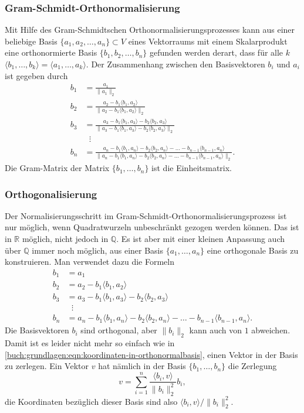 \subsubsection{Gram-Schmidt-Orthonormalisierung}
Mit Hilfe des Gram-Schmidtschen Orthonormalisierungsprozesses kann aus
einer beliebige Basis $\{a_1,a_2,\dots,a_n\}\subset V$ eines Vektorraums
mit einem Skalarprodukt eine orthonormierte Basis 
$\{b_1,b_2,\dots,b_n\}$ gefunden werden derart, dass für alle $k$
$\langle b_1,\dots,b_k\rangle = \langle a_1,\dots ,a_k\rangle$.
%
Der Zusammenhang zwischen den Basisvektoren $b_i$ und $a_i$ ist
gegeben durch
\begin{align*}
b_1&=\frac{a_1}{\|a_1\|_2}
\\
b_2&=\frac{a_2-b_1\langle b_1,a_2\rangle}{\|a_2-b_1\langle b_1,a_2\rangle\|_2}
\\
b_3&=\frac{a_3-b_1\langle b_1,a_3\rangle-b_2\langle b_2,a_3\rangle}{\|a_3-b_1\langle b_1,a_3\rangle-b_2\langle b_2,a_3\rangle\|_2}
\\
&\phantom{n}\vdots\\
b_n
&=
\frac{
a_n-b_1\langle b_1,a_n\rangle-b_2\langle b_2,a_n\rangle
-\dots-b_{n-1}\langle b_{n-1},a_n\rangle
}{
\|
a_n-b_1\langle b_1,a_n\rangle-b_2\langle b_2,a_n\rangle
-\dots-b_{n-1}\langle b_{n-1},a_n\rangle
\|_2
}.
\end{align*}
Die Gram-Matrix der Matrix $\{b_1,\dots,b_n\}$ ist die Einheitsmatrix.

\subsubsection{Orthogonalisierung}
Der Normalisierungsschritt im Gram-Schmidt-Orthonormalisierungsprozess
ist nur möglich, wenn Quadratwurzeln unbeschränkt gezogen werden können.
Das ist in $\mathbb{R}$ möglich, nicht jedoch in $\mathbb{Q}$.
Es ist aber mit einer kleinen Anpassung auch über $\mathbb{Q}$
immer noch möglich, aus einer Basis $\{a_1,\dots,a_n\}$ eine orthogonale
Basis zu konstruieren.
Man verwendet dazu die Formeln
\begin{align*}
b_1&=a_1
\\
b_2&=a_2-b_1\langle b_1,a_2\rangle
\\
b_3&=a_3-b_1\langle b_1,a_3\rangle-b_2\langle b_2,a_3\rangle
\\
&\phantom{n}\vdots\\
b_n
&=
a_n-b_1\langle b_1,a_n\rangle-b_2\langle b_2,a_n\rangle
-\dots-b_{n-1}\langle b_{n-1},a_n\rangle.
\end{align*}
Die Basisvektoren $b_i$ sind orthogonal, aber $\|b_i\|_2$ kann auch
von $1$ abweichen.
Damit ist es leider nicht mehr so einfach 
wie in \eqref{buch:grundlagen:eqn:koordinaten-in-orthonormalbasis},
einen Vektor in der Basis zu zerlegen.
Ein Vektor $v$ hat nämlich in der Basis $\{b_1,\dots,b_n\}$ die Zerlegung
\begin{equation}
v
=
\sum_{i=1}^n
\frac{\langle b_i,v\rangle}{\|b_i\|_2^2} b_i,
\label{buch:grundlagen:eqn:orthogonal-basiszerlegung}
\end{equation}
die Koordinaten bezüglich dieser Basis sind also
$\langle b_i,v\rangle/\|b_i\|_2^2$.

